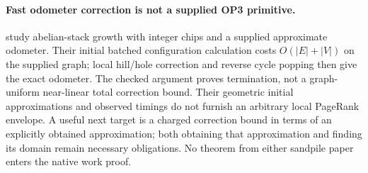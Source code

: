 \paragraph{Fast odometer correction is not a supplied OP3 primitive.}
\citet[Section 4, pp.\ 10--13]{friedrich2013fast} study abelian-stack
growth with integer chips and a supplied approximate odometer. Their
initial batched configuration calculation costs $O(|E|+|V|)$ on the
supplied graph; local hill/hole correction and reverse cycle popping
then give the exact odometer. The checked argument proves termination,
not a graph-uniform near-linear total correction bound. Their geometric
initial approximations and observed timings do not furnish an arbitrary
local PageRank envelope. A useful next target is a charged correction
bound in terms of an explicitly obtained approximation; both obtaining
that approximation and finding its domain remain necessary obligations.
No theorem from either sandpile paper enters the native work proof.
